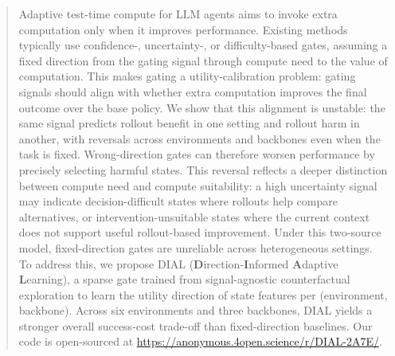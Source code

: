 \begin{abstract}
Adaptive test-time compute for LLM agents aims to invoke extra computation only when it improves performance. Existing methods typically use confidence-, uncertainty-, or difficulty-based gates, assuming a fixed direction from the gating signal through compute need to the value of computation. This makes gating a utility-calibration problem: gating signals should align with whether extra computation improves the final outcome over the base policy. We show that this alignment is unstable: the same signal predicts rollout benefit in one setting and rollout harm in another, with reversals across environments and backbones even when the task is fixed. Wrong-direction gates can therefore worsen performance by precisely selecting harmful states.
This reversal reflects a deeper distinction between compute need and compute suitability: a high uncertainty signal may indicate decision-difficult states where rollouts help compare alternatives, or intervention-unsuitable states where the current context does not support useful rollout-based improvement. Under this two-source model, fixed-direction gates are unreliable across heterogeneous settings. To address this, we propose DIAL (\textbf{D}irection-\textbf{I}nformed \textbf{A}daptive \textbf{L}earning), a sparse gate trained from signal-agnostic counterfactual exploration to learn the utility direction of state features per (environment, backbone). Across six environments and three backbones, DIAL yields a stronger overall success-cost trade-off than fixed-direction baselines. Our code is open-sourced at \url{https://anonymous.4open.science/r/DIAL-2A7E/}.

\end{abstract}
